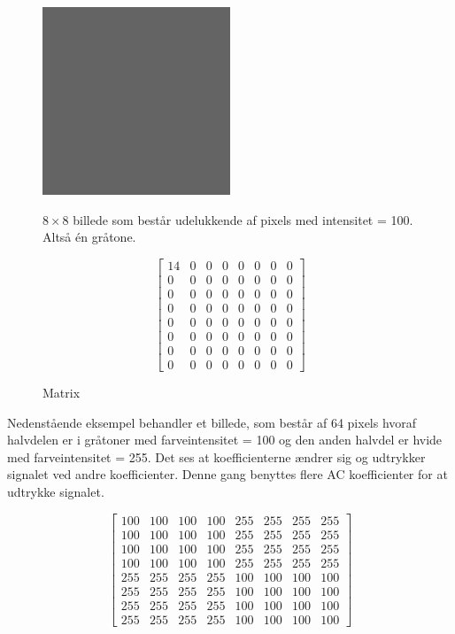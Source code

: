 \begin{figure}[htbp]
\begin{minipage}[b]{0.5\linewidth}
\centering
\includegraphics[width=0.5\textwidth]{Billeder/8x8_eks1.png}
\caption{$8\times8$ billede som består udelukkende af pixels med intensitet = 100. Altså én gråtone.}
\label{fig:8x8grå}
\end{minipage}
\hspace{0.5cm}
\begin{minipage}[b]{0.5\linewidth}
\centering
\[\begin{bmatrix}
14	&	0	&	0	&	0	&	0	&	0	&	0	&	0\\
0	&	0	&	0	&	0	&	0	&	0	&	0	&	0\\
0	&	0	&	0	&	0	&	0	&	0	&	0	&	0\\
0	&	0	&	0	&	0	&	0	&	0	&	0	&	0\\
0	&	0	&	0	&	0	&	0	&	0	&	0	&	0\\
0	&	0	&	0	&	0	&	0	&	0	&	0	&	0\\
0	&	0	&	0	&	0	&	0	&	0	&	0	&	0\\
0	&	0	&	0	&	0	&	0	&	0	&	0	&	0
\end{bmatrix}
\]
\caption{Matrix}
\label{fig:gråmatrix}
\end{minipage}
\end{figure}

Nedenstående eksempel behandler et billede, som består af 64 pixels hvoraf halvdelen er i gråtoner med farveintensitet = 100 og den anden halvdel er hvide med farveintensitet = 255. Det ses at koefficienterne ændrer sig og udtrykker signalet ved andre koefficienter. Denne gang benyttes flere AC koefficienter for at udtrykke signalet.

\[\begin{bmatrix}
100	&	100	&	100	&	100	&	255	&	255	&	255	&	255\\
100	&	100	&	100	&	100	&	255	&	255	&	255	&	255\\
100	&	100	&	100	&	100	&	255	&	255	&	255	&	255\\
100	&	100	&	100	&	100	&	255	&	255	&	255	&	255\\
255	&	255	&	255	&	255	&	100	&	100	&	100	&	100\\
255	&	255 &	255	&	255	&	100	&	100	&	100	&	100\\
255	&	255	&	255	&	255	&	100	&	100	&	100	&	100\\
255	&	255	&	255	&	255	&	100	&	100	&	100	&	100
\end{bmatrix}
\]

